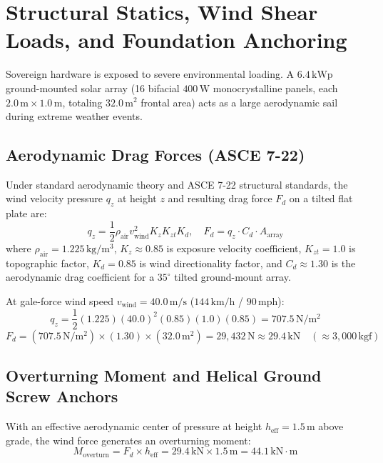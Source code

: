 \section{Structural Statics, Wind Shear Loads, and Foundation Anchoring}
\label{sec:mech_structural}

Sovereign hardware is exposed to severe environmental loading. A $6.4\,\mathrm{kWp}$ ground-mounted solar array (16 bifacial $400\,\mathrm{W}$ monocrystalline panels, each $2.0\,\mathrm{m} \times 1.0\,\mathrm{m}$, totaling $32.0\,\mathrm{m^2}$ frontal area) acts as a large aerodynamic sail during extreme weather events.

\subsection{Aerodynamic Drag Forces (ASCE 7-22)}
Under standard aerodynamic theory and ASCE 7-22 structural standards, the wind velocity pressure $q_z$ at height $z$ and resulting drag force $F_d$ on a tilted flat plate are:
\begin{equation}
q_z = \frac{1}{2} \rho_{\mathrm{air}} v_{\mathrm{wind}}^2 K_z K_{zt} K_d, \quad F_d = q_z \cdot C_d \cdot A_{\mathrm{array}}
\label{eq:wind_drag_force}
\end{equation}
where $\rho_{\mathrm{air}} = 1.225\,\mathrm{kg/m^3}$, $K_z \approx 0.85$ is exposure velocity coefficient, $K_{zt} = 1.0$ is topographic factor, $K_d = 0.85$ is wind directionality factor, and $C_d \approx 1.30$ is the aerodynamic drag coefficient for a $35^\circ$ tilted ground-mount array.

At gale-force wind speed $v_{\mathrm{wind}} = 40.0\,\mathrm{m/s}$ ($144\,\mathrm{km/h}$ / $90\,\mathrm{mph}$):
\begin{equation}
q_z = \frac{1}{2}(1.225)(40.0)^2 (0.85)(1.0)(0.85) = 707.5\,\mathrm{N/m^2}
\label{eq:wind_pressure_val}
\end{equation}
\begin{equation}
F_d = (707.5\,\mathrm{N/m^2}) \times (1.30) \times (32.0\,\mathrm{m^2}) = 29,432\,\mathrm{N} \approx 29.4\,\mathrm{kN} \quad (\approx 3,000\,\mathrm{kgf})
\label{eq:total_wind_force}
\end{equation}

\subsection{Overturning Moment and Helical Ground Screw Anchors}
With an effective aerodynamic center of pressure at height $h_{\mathrm{eff}} = 1.5\,\mathrm{m}$ above grade, the wind force generates an overturning moment:
\begin{equation}
M_{\mathrm{overturn}} = F_d \times h_{\mathrm{eff}} = 29.4\,\mathrm{kN} \times 1.5\,\mathrm{m} = 44.1\,\mathrm{kN\cdot m}
\label{eq:overturning_moment}
\end{equation}

